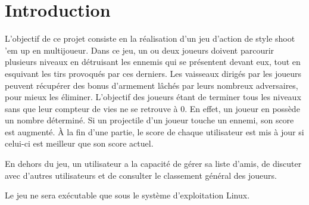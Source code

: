 \documentclass[a4paper,12pt]{article}
\begin{document}
\begin{titlepage}
\begin{center}
        \end{center}

    \end{titlepage}

\newpage

\tableofcontents

\newpage


\section{Introduction}

L’objectif de ce projet consiste en la réalisation d'un jeu d'action de style shoot 'em up en multijoueur. Dans ce jeu, un ou deux joueurs doivent parcourir plusieurs niveaux en détruisant les ennemis qui se présentent devant eux, tout en esquivant les tirs provoqués par ces derniers. Les vaisseaux dirigés par les joueurs peuvent récupérer des bonus d’armement lâchés par leurs nombreux adversaires, pour mieux les éliminer. L'objectif des joueurs étant de terminer tous les niveaux sans que leur compteur de vies ne se retrouve à 0. En effet, un joueur en possède un nombre déterminé. Si un projectile d'un joueur touche un ennemi, son score est augmenté. À la fin d'une partie, le score de chaque utilisateur est mis à jour si celui-ci est meilleur que son score actuel.

En dehors du jeu, un utilisateur a la capacité de gérer sa liste d'amis, de discuter avec d'autres utilisateurs et de consulter le classement général des joueurs.

Le jeu ne sera exécutable que sous le système d'exploitation Linux.
\end{document}
